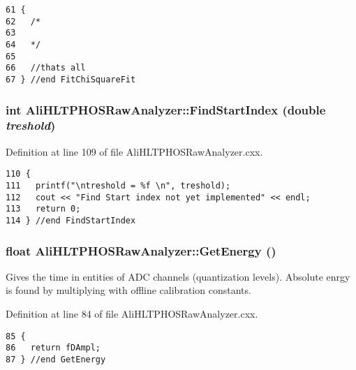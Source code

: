 \footnotesize\begin{verbatim}61 {
62   /*
63 
64   */
65 
66   //thats all 
67 } //end FitChiSquareFit
\end{verbatim}\normalsize 


\subsubsection{\setlength{\rightskip}{0pt plus 5cm}int Ali\-HLTPHOSRaw\-Analyzer::Find\-Start\-Index (double {\em treshold})\hspace{0.3cm}{\tt  [inherited]}}\label{classAliHLTPHOSRawAnalyzer_AliHLTPHOSRawAnalyzerPeakFindera9}




Definition at line 109 of file Ali\-HLTPHOSRaw\-Analyzer.cxx.

\footnotesize\begin{verbatim}110 {
111   printf("\ntreshold = %f \n", treshold);
112   cout << "Find Start index not yet implemented" << endl;
113   return 0;
114 } //end FindStartIndex
\end{verbatim}\normalsize 


\subsubsection{\setlength{\rightskip}{0pt plus 5cm}float Ali\-HLTPHOSRaw\-Analyzer::Get\-Energy ()\hspace{0.3cm}{\tt  [inherited]}}\label{classAliHLTPHOSRawAnalyzer_AliHLTPHOSRawAnalyzerPeakFindera11}


Gives the time in entities of ADC channels (quantization levels). Absolute enrgy is found by multiplying with offline calibration constants. 

Definition at line 84 of file Ali\-HLTPHOSRaw\-Analyzer.cxx.

\footnotesize\begin{verbatim}85 {
86   return fDAmpl;
87 } //end GetEnergy
\end{verbatim}\normalsize 


